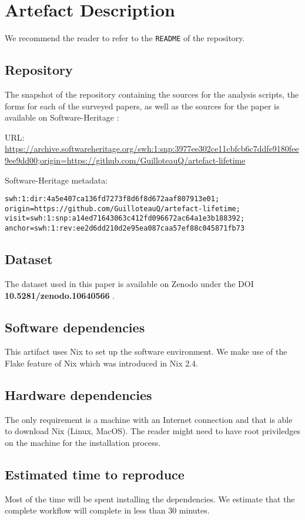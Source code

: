 \documentclass[sigconf,natbib=false]{acmart}
\begin{document}
\newpage

\appendix

\section{Artefact Description}

We recommend the reader to refer to the \texttt{README} of the repository.

\subsection{Repository}

The snapshot of the repository containing the sources for the analysis scripts, the forms for each of the surveyed papers, as well as the sources for the paper is available on Software-Heritage \cite{artefact-lifetime}:

URL: \url{https://archive.softwareheritage.org/swh:1:snp:3977ee302ce11cbfcb6c7ddfe9180fee9ee9dd00;origin=https://github.com/GuilloteauQ/artefact-lifetime}


Software-Heritage metadata:

\begin{verbatim}
swh:1:dir:4a5e407ca136fd7273f8d6f8d672aaf807913e01;
origin=https://github.com/GuilloteauQ/artefact-lifetime;
visit=swh:1:snp:a14ed71643063c412fd096672ac64a1e3b188392;
anchor=swh:1:rev:ee2d6dd210d2e95ea087caa57ef88c045871fb73
\end{verbatim}

\subsection{Dataset}

The dataset used in this paper is available on Zenodo under the DOI \textbf{10.5281/zenodo.10640566} \cite{guilloteau_2024_10640566}.

\subsection{Software dependencies}

This artifact uses Nix to set up the software environment.
We make use of the Flake feature of Nix which was introduced in Nix 2.4.

\subsection{Hardware dependencies}

The only requirement is a machine with an Internet connection and that is able to download Nix (Linux, MacOS).
The reader might need to have root priviledges on the machine for the installation process.

\subsection{Estimated time to reproduce}

Most of the time will be spent installing the dependencies.
We estimate that the complete workflow will complete in less than 30 minutes.
\end{document}
